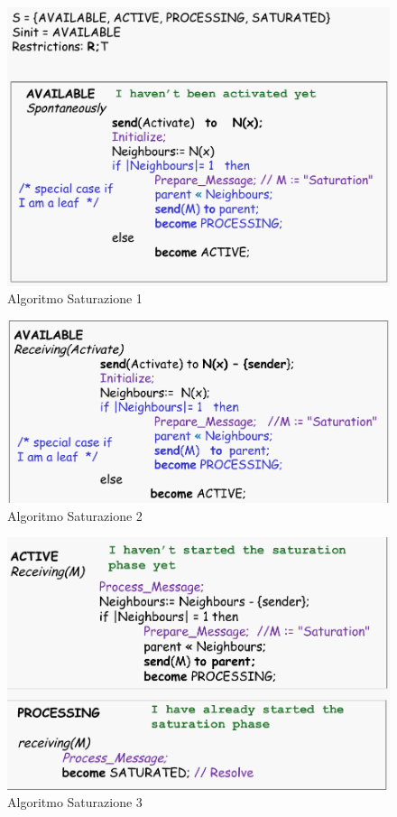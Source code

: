 \documentclass[12pt]{article}
\begin{document}
		\begin{figure}[h!]
			\centering
			\includegraphics[scale=0.33]{img/sat1.png}
			\caption{Algoritmo Saturazione 1}
		\end{figure}
		\begin{figure}[h!]
			\centering
			\includegraphics[scale=0.3]{img/sat2.png}
			\caption{Algoritmo Saturazione 2}
		\end{figure}
		\begin{figure}[h!]
			\centering
			\includegraphics[scale=0.3]{img/sat3.png}
			\caption{Algoritmo Saturazione 3}
		\end{figure}
		
\end{document}
